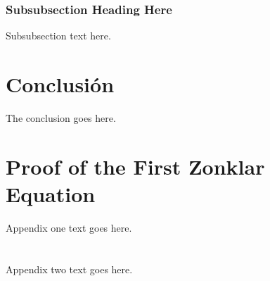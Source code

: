 \documentclass[conference,onecolumn]{IEEEtran}
\begin{document}
\subsubsection{Subsubsection Heading Here}
Subsubsection text here.

\section{Conclusión}
The conclusion goes here.

\appendices
\section{Proof of the First Zonklar Equation}
Appendix one text goes here.

\section{}
Appendix two text goes here.




\end{document}
